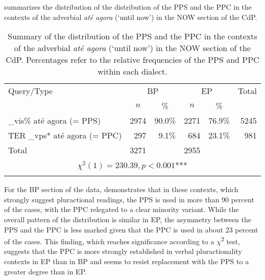 \documentclass[output=paper,colorlinks,citecolor=brown]{langscibook}
\begin{document}
 summarizes the distribution of the distribution of the PPS and the PPC in the contexts of the adverbial \textit{até agora} (‘until now’) in the NOW section of the CdP. 

\begin{table}
\begin{tabular}{l rr rr r}
\lsptoprule
{Query/Type}                 & \multicolumn{2}{c}{BP} & \multicolumn{2}{c}{EP} & {Total}\\\cmidrule(lr){2-3}\cmidrule(lr){4-5}
                             & \multicolumn{1}{c}{$n$} & \multicolumn{1}{c}{\%} & \multicolumn{1}{c}{$n$} & \multicolumn{1}{c}{\%} & \\\midrule
\_vis\% até agora (= PPS)    & 2974 & 90.0\%  & 2271 & 76.9\%  & 5245\\
TER \_vps* até agora (= PPC) & 297  & 9.1\%   & 684 & 23.1\%   & 981\\\addlinespace
Total                        & 3271 &         & 2955 &          & \\\midrule
\multicolumn{6}{c}{$\chi^2(1)=230.39, p<0.001$***}\\
\lspbottomrule
\end{tabular}
\caption{Summary of the distribution of the PPS and the PPC in the contexts of the adverbial \textit{até agora} (‘until now’) in the NOW section of the CdP. Percentages refer to the relative frequencies of the PPS and PPC within each dialect.}
\label{tab:rb6}
\end{table}
 
For the BP section of the data,  demonstrates that in these contexts, which strongly suggest pluractional readings, the PPS is used in more than 90 percent of the cases, with the PPC relegated to a clear minority variant. While the overall pattern of the distribution is similar in EP, the asymmetry between the PPS and the PPC is less marked given that the PPC is used in about 23 percent of the cases. This finding, which reaches significance according to a $\chi$\textsuperscript{2} test, suggests that the PPC is more strongly established in verbal pluractionality contexts in EP than in BP and seems to resist replacement with the PPS to a greater degree than in EP. 

\pagebreak
{\sloppy\printbibliography[heading=subbibliography,notkeyword=this]}
\end{document}
